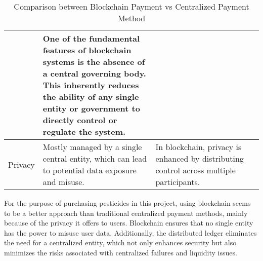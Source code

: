 \begin{table}[H]
\begin{tabular}{|>{\centering\arraybackslash}p{0.12\linewidth}|p{0.45\linewidth}|p{0.45\linewidth}|}
        &
        One of the fundamental features of blockchain systems is the absence of a central governing body. This inherently reduces the ability of any single entity or government to directly control or regulate the system.
        \\
        \hline
        Privacy 
        &
       Mostly managed by a single central entity, which can lead to potential data exposure and misuse.
        & 
        In blockchain, privacy is enhanced by distributing control across multiple participants. 
        \\
        \hline
    \end{tabular}
    \caption{Comparison between Blockchain Payment vs Centralized Payment Method}
    \label{tab:centralised_and_blockchain}
\end{table}

For the purpose of purchasing pesticides in this project, using blockchain seems to be a better approach than traditional centralized payment methods, mainly because of the privacy it offers to users. Blockchain ensures that no single entity has the power to misuse user data. Additionally, the distributed ledger eliminates the need for a centralized entity, which not only enhances security but also minimizes the risks associated with centralized failures and liquidity issues. 

